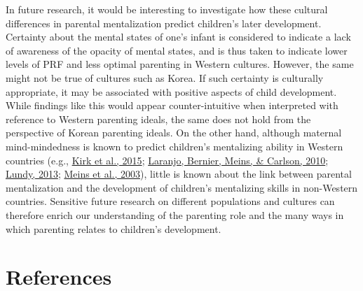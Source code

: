 \documentclass[
]{article}
\begin{document}
In future research, it would be interesting to investigate how these cultural differences in parental mentalization predict children's later development. Certainty about the mental states of one's infant is considered to indicate a lack of awareness of the opacity of mental states, and is thus taken to indicate lower levels of PRF and less optimal parenting in Western cultures. However, the same might not be true of cultures such as Korea. If such certainty is culturally appropriate, it may be associated with positive aspects of child development. While findings like this would appear counter-intuitive when interpreted with reference to Western parenting ideals, the same does not hold from the perspective of Korean parenting ideals. On the other hand, although maternal mind-mindedness is known to predict children's mentalizing ability in Western countries (e.g., \protect\hyperlink{ref-Kirk2015}{Kirk et al., 2015}; \protect\hyperlink{ref-Laranjo2010}{Laranjo, Bernier, Meins, \& Carlson, 2010}; \protect\hyperlink{ref-Lundy2013}{Lundy, 2013}; \protect\hyperlink{ref-Meins2003}{Meins et al., 2003}), little is known about the link between parental mentalization and the development of children's mentalizing skills in non-Western countries. Sensitive future research on different populations and cultures can therefore enrich our understanding of the parenting role and the many ways in which parenting relates to children's development.

\newpage

\hypertarget{references}{%
\section*{References}\label{references}}
\end{document}

